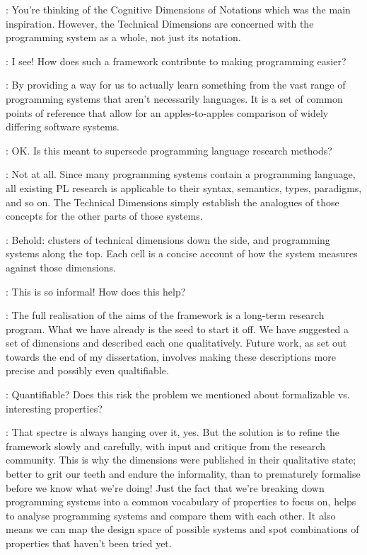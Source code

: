 \documentclass[runningheads]{llncs}
\newcommand{\T}{Tomas}
\newcommand{\J}{Joel}
\newcommand{\says}[2][gg]{\vspace{0.5em}\noindent\hangindent=0.5cm{\textsc{#1}}: #2}
\begin{document}
\says[\J]{You're thinking of the Cognitive Dimensions of Notations \cite{green-1990-cogdims} which was the main inspiration. However, the Technical Dimensions are concerned with the programming system as a whole, not just its notation.}

\says[\T]{I see! How does such a framework contribute to making programming easier?}

\says[\J]{By providing a way for us to actually learn something from the vast range of programming systems that aren't necessarily languages. It is a set of common points of reference that allow for an apples-to-apples comparison of widely differing software systems.}

\says[\T]{OK. Is this meant to supersede programming language research methods?}

\says[\J]{Not at all. Since many programming systems contain a programming language, all existing PL research is applicable to their syntax, semantics, types, paradigms, and so on. The Technical Dimensions simply establish the analogues of those concepts for the other parts of those systems.}

\says[\J]{Behold: clusters of technical dimensions down the side, and programming systems along the top. Each cell is a concise account of how the system measures against those dimensions.}

\says[\T]{This is so informal! How does this help?}

\says[\J]{The full realisation of the aims of the framework is a long-term research program. What we have already is the seed to start it off. We have suggested a set of dimensions and described each one qualitatively. Future work, as set out towards the end of my dissertation, involves making these descriptions more precise and possibly even qualtifiable.}

\says[\T]{Quantifiable? Does this risk the problem we mentioned about formalizable vs. interesting properties?}

\says[\J]{That spectre is always hanging over it, yes. But the solution is to refine the framework slowly and carefully, with input and critique from the research community. This is why the dimensions were published in their qualitative state; better to grit our teeth and endure the informality, than to prematurely formalise before we know what we're doing! Just the fact that we're breaking down programming systems into a common vocabulary of properties to focus on, helps to analyse programming systems and compare them with each other. It also means we can map the design space of possible systems and spot combinations of properties that haven't been tried yet.}
\end{document}
